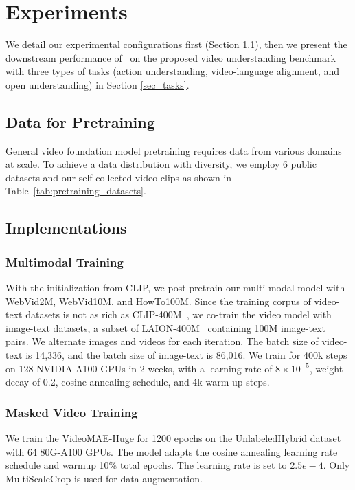 \section{Experiments}

We detail our experimental configurations first (Section \ref{sec_config}), 
then we present the downstream performance of \model~on the proposed video understanding benchmark with three types of tasks (action understanding, video-language alignment, and open understanding) in Section \ref{sec_tasks}.

\subsection{Data for Pretraining} \label{sec_config}

General video foundation model pretraining requires data from various domains at scale. To achieve a data distribution with diversity, we employ 6 public datasets and our self-collected video clips as shown in Table~\ref{tab:pretraining_datasets}. 







\subsection{Implementations}

\subsubsection{Multimodal Training}

With the initialization from CLIP, we post-pretrain our multi-modal model with WebVid2M, WebVid10M, and HowTo100M. Since the training corpus of video-text datasets is not as rich as CLIP-400M~\cite{CLIP}, we co-train the video model with image-text datasets, a subset of LAION-400M~\cite{laion400m} containing 100M image-text pairs. We alternate images and videos for each iteration. The batch size of video-text is 14,336, and the batch size of image-text is 86,016. We train for 400k steps on 128 NVIDIA A100 GPUs in 2 weeks, with a learning rate of $8\times 10^{-5}$, weight decay of 0.2, cosine annealing schedule, and 4k warm-up steps.

\subsubsection{Masked Video Training}
We train the VideoMAE-Huge for 1200 epochs on the UnlabeledHybrid dataset with 64 80G-A100 GPUs. The model adapts the cosine annealing learning rate schedule and warmup 10\% total epochs. The learning rate is set to $2.5e-4$. Only MultiScaleCrop is used for data augmentation.

